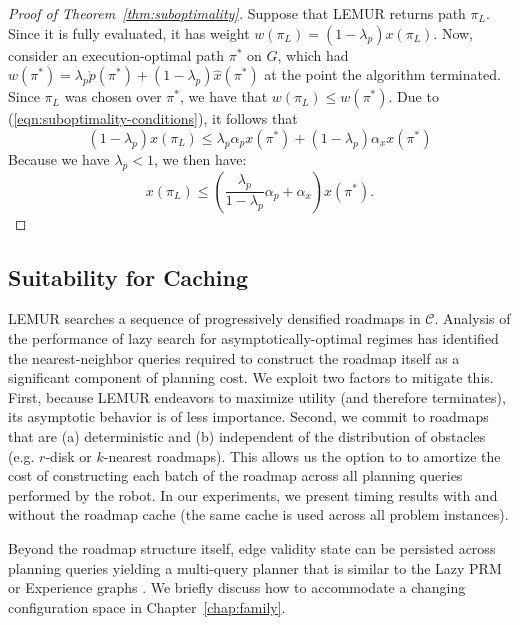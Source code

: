\begin{proof}[Proof of Theorem~\ref{thm:suboptimality}]
   Suppose that LEMUR returns path $\pi_L$.
   Since it is fully evaluated, it has weight
   $w(\pi_L) = (1\!-\!\lambda_p) x(\pi_L)$.
   Now, consider an execution-optimal path $\pi^*$ on $G$,
   which had
   $w(\pi^*) = \lambda_p \grave{p}(\pi^*) + (1\!-\!\lambda_p) \hat{x}(\pi^*)$
   at the point the algorithm terminated.
   Since $\pi_L$ was chosen over $\pi^*$,
   we have that $w(\pi_L) \leq w(\pi^*)$.
   Due to (\ref{eqn:suboptimality-conditions}),
   it follows that
   \begin{equation}
      (1\!-\!\lambda_p) x(\pi_L)
      \leq
      \lambda_p \alpha_p x(\pi^*) + (1\!-\!\lambda_p) \alpha_x x(\pi^*)
   \end{equation}
   Because we have $\lambda_p < 1$,
   we then have:
   \begin{equation}
      x(\pi_L)
      \leq
      \left( \frac{\lambda_p}{1-\lambda_p} \alpha_p + \alpha_x \right)
      x(\pi^*).
   \end{equation}
\end{proof}

\subsection{Suitability for Caching}

LEMUR searches a sequence of progressively densified roadmaps in
$\mathcal{C}$.
Analysis of the performance of lazy search for asymptotically-optimal
regimes \citep{hauser2015lazy}
has identified the nearest-neighbor queries required to construct
the roadmap itself as a significant component of planning cost.
We exploit two factors to mitigate this.
First,
because LEMUR endeavors to maximize utility (and therefore terminates),
its asymptotic behavior is of less importance.
Second,
we commit to roadmaps that are
(a) deterministic and
(b) independent of the
distribution of obstacles
(e.g. $r$-disk or $k$-nearest roadmaps).
This allows us the option to to amortize the cost of constructing
each batch of the roadmap across all planning queries performed by
the robot.
In our experiments,
we present timing results with and without the roadmap cache
(the same cache is used across all problem instances).

Beyond the roadmap structure itself,
edge validity state can be persisted across planning queries
yielding a multi-query planner
that is similar to the Lazy PRM or
Experience graphs \citep{phillips2012egraphs}.
We briefly discuss how to accommodate a changing configuration space in
Chapter~\ref{chap:family}.

